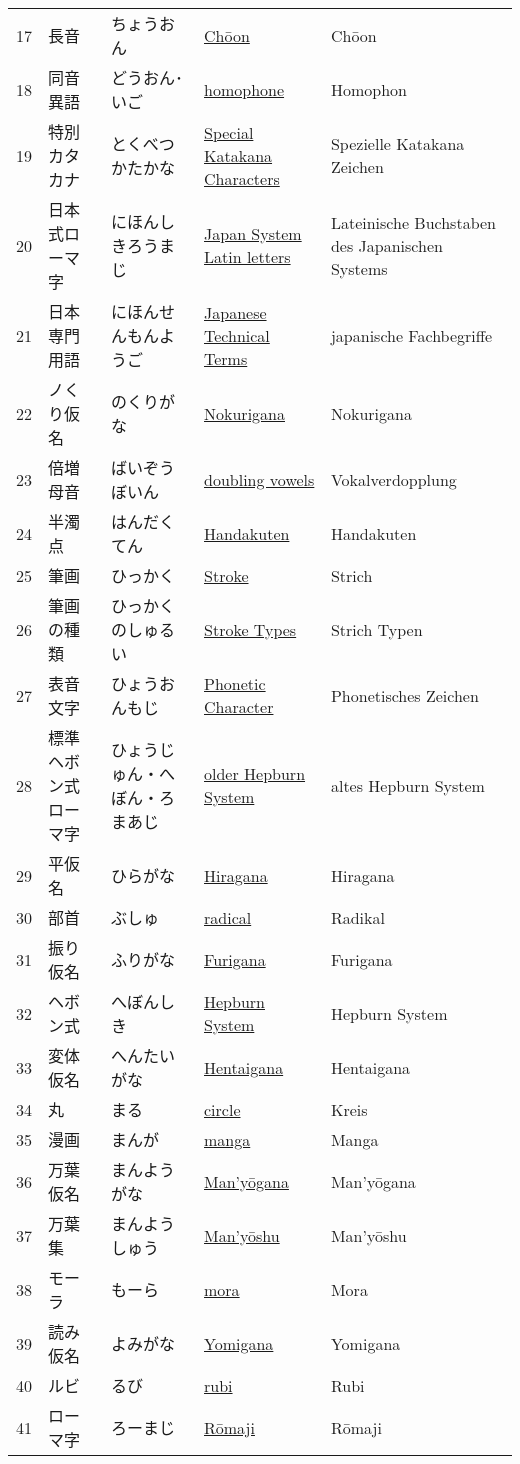 \begin{longtable}[c]{p{.5cm}p{3.5cm}p{4cm}p{3.5cm}p{3.5cm}}
17&長音&ちょうおん&\hyperref[sec:Choon]{Chōon}&Chōon\\
18&同音異語&どうおん･いご&\hyperref[sec:Homophone]{homophone}&Homophon\\
19&特別カタカナ&とくべつかたかな&\hyperref[sec:SpecialKatakanaCharacters]{Special Katakana Characters}&Spezielle Katakana Zeichen\\
20&日本式ローマ字&にほんしきろうまじ&\hyperref[sec:JapanSystemLatinLetters]{Japan System Latin letters}&Lateinische Buchstaben des Japanischen Systems\\
21&日本専門用語&にほんせんもんようご&\hyperref[sec:JapaneseTechnicalTerms]{Japanese Technical Terms}&japanische Fachbegriffe\\
22&ノくり仮名&のくりがな&\hyperref[sec:Nokurigana]{Nokurigana}&Nokurigana\\
23&倍増母音&ばいぞうぼいん&\hyperref[sec:DoublingVowels]{doubling vowels}&Vokalverdopplung\\
24&半濁点&はんだくてん&\hyperref[sec:Handakuten]{Handakuten}&Handakuten\\
25&筆画&ひっかく&\hyperref[sec:Stroke]{Stroke}&Strich\\
26&筆画の種類&ひっかくのしゅるい&\hyperref[sec:StrokeTypes]{Stroke Types}&Strich Typen\\
27&表音文字&ひょうおんもじ&\hyperref[sec:PhoneticCharacter]{Phonetic Character}&Phonetisches Zeichen\\
28&標準ヘボン式ローマ字&ひょうじゅん・へぼん・ろまあじ&\hyperref[sec:OlderHepburnSystem]{older Hepburn System}&altes Hepburn System\\
29&平仮名&ひらがな&\hyperref[sec:Hiragana]{Hiragana}&Hiragana\\
30&部首&ぶしゅ&\hyperref[sec:Radical]{radical}&Radikal\\
31&振り仮名&ふりがな&\hyperref[sec:Furigana]{Furigana}&Furigana\\
32&ヘボン式&へぼんしき&\hyperref[sec:HepburnSystem]{Hepburn System}&Hepburn System\\
33&変体仮名&へんたいがな&\hyperref[sec:Hentaigana]{Hentaigana}&Hentaigana\\
34&丸&まる&\hyperref[sec:Circle]{circle}&Kreis\\
35&漫画&まんが&\hyperref[sec:Manga]{manga}&Manga\\
36&万葉仮名&まんようがな&\hyperref[sec:Manyogana]{Man'yōgana}&Man'yōgana\\
37&万葉集&まんようしゅう&\hyperref[sec:Manyoshu]{Man'yōshu}&Man'yōshu\\
38&モーラ&もーら&\hyperref[sec:Mora]{mora}&Mora\\
39&読み仮名&よみがな&\hyperref[sec:Yomigana]{Yomigana}&Yomigana\\
40&ルビ&るび&\hyperref[sec:Rubi]{rubi}&Rubi\\
41&ローマ字&ろーまじ&\hyperref[sec:Romaji]{Rōmaji}&Rōmaji\\
\end{longtable}
